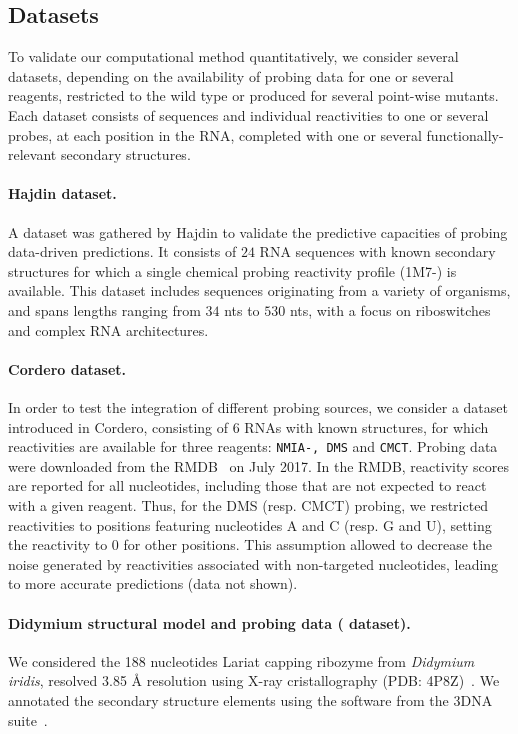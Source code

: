 \documentclass[a4,center,fleqn]{NAR}
\begin{document}
\subsection*{Datasets} 
\label{sec:datasets}
To validate our computational method quantitatively, we consider several datasets, depending on the availability of probing data for one or several reagents, restricted to the wild type or produced for several point-wise mutants. Each dataset consists of sequences and individual reactivities to one or several probes, at each position in the RNA, completed with one or several functionally-relevant secondary structures.

\paragraph{Hajdin dataset.} 
A dataset was gathered by Hajdin\etal\cite{Hajdin2013} to validate the predictive capacities of probing data-driven predictions. It consists of $24$ RNA sequences with known secondary structures for which a single chemical probing reactivity profile (1M7-\SH) is available.
This dataset includes sequences originating from a variety of organisms, and spans lengths ranging from $34$ nts to $530$ nts, with a focus on riboswitches and complex RNA architectures. 


\paragraph{Cordero dataset.} 
In order to test the integration of different probing sources, we consider a dataset introduced in Cordero\etal\cite{Cordero2012}, consisting of $6$ RNAs with known structures, for which reactivities are available for three reagents: {\tt NMIA-\SH, DMS} and {\tt CMCT}. 
Probing data were downloaded from the RMDB~\citep{Cordero2012a} on July 2017. In the RMDB, reactivity scores are reported for all nucleotides, including those that are not expected to react with a given reagent. Thus, for the DMS (resp. CMCT) probing, we restricted reactivities to positions featuring nucleotides {\sf A} and {\sf C} (resp. {\sf G} and {\sf U}), setting the reactivity to 0 for other positions. This assumption allowed to decrease the noise generated by reactivities associated with non-targeted nucleotides, leading to more accurate predictions (data not shown). 



\paragraph{Didymium structural model and probing data (\didy{} dataset).} 
We considered the 188 nucleotides Lariat capping ribozyme from {\itshape Didymium iridis}, resolved 3.85 \AA{} resolution using X-ray cristallography (PDB: 4P8Z)~\citep{Meyer2014}.  We annotated the secondary structure elements using the  software from the 3DNA suite~\cite{Lu2015}. 
\end{document}
